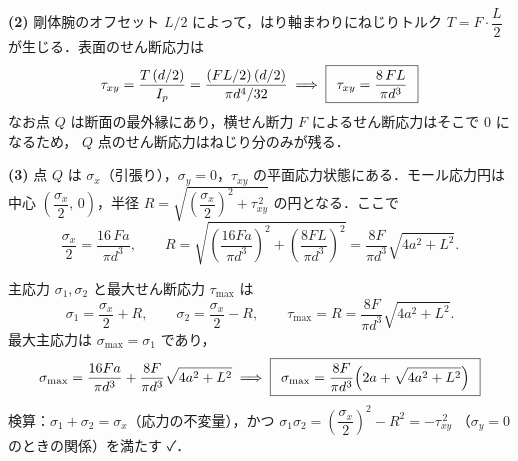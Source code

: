 \documentclass[11pt,a4paper]{article}
\begin{document}
\medskip
\noindent\textbf{(2)}\quad
剛体腕のオフセット $L/2$ によって，はり軸まわりにねじりトルク
$T=F\cdot\dfrac{L}{2}$ が生じる．表面のせん断応力は
\[
  \tau_{xy}=\frac{T\,(d/2)}{I_p}=\frac{(FL/2)\,(d/2)}{\pi d^4/32}
  \;\Longrightarrow\;
  \boxed{\,\;\tau_{xy}=\frac{8\,F L}{\pi d^3}\;\,}
\]
なお点 $Q$ は断面の最外縁にあり，横せん断力 $F$ によるせん断応力はそこで $0$ になるため，
$Q$ 点のせん断応力はねじり分のみが残る．

\medskip
\noindent\textbf{(3)}\quad
点 $Q$ は $\sigma_x$（引張り），$\sigma_y=0$，$\tau_{xy}$ の平面応力状態にある．モール応力円は
中心 $\left(\dfrac{\sigma_x}{2},\,0\right)$，半径 $R=\sqrt{\left(\dfrac{\sigma_x}{2}\right)^2+\tau_{xy}^{\,2}}$ の円となる．ここで
\[
  \frac{\sigma_x}{2}=\frac{16\,F a}{\pi d^3},\qquad
  R=\sqrt{\left(\frac{16Fa}{\pi d^3}\right)^2+\left(\frac{8FL}{\pi d^3}\right)^2}
   =\frac{8F}{\pi d^3}\sqrt{4a^2+L^2}.
\]

\begin{center}
\end{center}

\noindent 主応力 $\sigma_1,\sigma_2$ と最大せん断応力 $\tau_{\max}$ は
\[
  \sigma_{1}=\frac{\sigma_x}{2}+R,\qquad
  \sigma_{2}=\frac{\sigma_x}{2}-R,\qquad
  \tau_{\max}=R=\frac{8F}{\pi d^3}\sqrt{4a^2+L^2}.
\]
最大主応力は $\sigma_{\max}=\sigma_1$ であり，
\[
  \sigma_{\max}=\frac{16Fa}{\pi d^3}+\frac{8F}{\pi d^3}\sqrt{4a^2+L^2}
  \;\Longrightarrow\;
  \boxed{\,\;\sigma_{\max}=\frac{8F}{\pi d^3}\Bigl(2a+\sqrt{4a^2+L^2}\Bigr)\;\,}
\]
検算：$\sigma_1+\sigma_2=\sigma_x$（応力の不変量），かつ
$\sigma_1\sigma_2=\left(\dfrac{\sigma_x}{2}\right)^2-R^2=-\tau_{xy}^{\,2}$
（$\sigma_y=0$ のときの関係）を満たす ✓．
\end{document}
